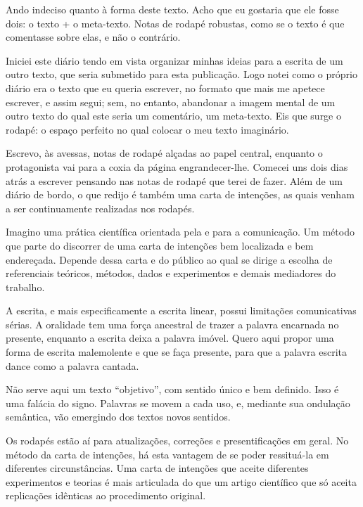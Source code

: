
Ando indeciso quanto à forma deste texto. Acho que eu gostaria que ele fosse dois: o texto + o meta-texto. Notas de rodapé robustas, como se o texto é que comentasse sobre elas, e não o contrário.

Iniciei este diário tendo em vista organizar minhas ideias para a escrita de um outro texto, que seria submetido para esta publicação. Logo notei como o próprio diário era o texto que eu queria escrever, no formato que mais me apetece escrever, e assim segui; sem, no entanto, abandonar a imagem mental de um outro texto do qual este seria um comentário, um meta-texto. Eis que surge o rodapé: o espaço perfeito no qual colocar o meu texto imaginário.

Escrevo, às avessas, notas de rodapé alçadas ao papel central, enquanto o protagonista vai para a coxia da página engrandecer-lhe. Comecei uns dois dias atrás a escrever pensando nas notas de rodapé que terei de fazer. Além de um diário de bordo, o que redijo é também uma carta de intenções, as quais venham a ser continuamente realizadas nos rodapés.

Imagino uma prática científica orientada pela e para a comunicação. Um método que parte do discorrer de uma carta de intenções bem localizada e bem endereçada. Depende dessa carta e do público ao qual se dirige a escolha de referenciais teóricos, métodos, dados e experimentos e demais mediadores do trabalho.

A escrita, e mais especificamente a escrita linear, possui limitações comunicativas sérias. A oralidade tem uma força ancestral de trazer a palavra encarnada no presente, enquanto a escrita deixa a palavra imóvel. Quero aqui propor uma forma de escrita malemolente e que se faça presente, para que a palavra escrita dance como a palavra cantada.

Não serve aqui um texto \enquote{objetivo}, com sentido único e bem definido. Isso é uma falácia do signo. Palavras se movem a cada uso, e, mediante sua ondulação semântica, vão emergindo dos textos novos sentidos.

Os rodapés estão aí para atualizações, correções e presentificações em geral. No método da carta de intenções, há esta vantagem de se poder ressituá-la em diferentes circunstâncias. Uma carta de intenções que aceite diferentes experimentos e teorias é mais articulada do que um artigo científico que só aceita replicações idênticas ao procedimento original.

